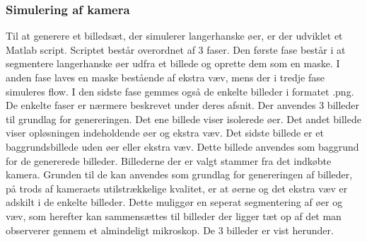 \newpage
\subsubsection{Simulering af kamera}
Til at generere et billedsæt, der simulerer langerhanske øer, er der udviklet et Matlab script. Scriptet består overordnet af 3 faser. Den første fase består i at segmentere langerhanske øer udfra et billede og oprette dem som en maske. I anden fase laves en maske bestående af ekstra væv, mens der i tredje fase simuleres flow. I den sidste fase gemmes også de enkelte billeder i formatet .png. De enkelte faser er nærmere beskrevet under deres afsnit. Der anvendes 3 billeder til grundlag for genereringen. Det ene billede viser isolerede øer. Det andet billede viser opløsningen indeholdende øer og ekstra væv. Det sidste billede er et baggrundsbillede uden øer eller ekstra væv. Dette billede anvendes som baggrund for de genererede billeder. Billederne der er valgt stammer fra det indkøbte kamera. Grunden til de kan anvendes som grundlag for genereringen af billeder, på trods af kameraets utilstrækkelige kvalitet, er at øerne og det ekstra væv er adskilt i de enkelte billeder. Dette muliggør en seperat segmentering af øer og væv, som  herefter kan sammensættes til billeder der ligger tæt op af det man observerer gennem et almindeligt mikroskop. De 3 billeder er vist herunder.

